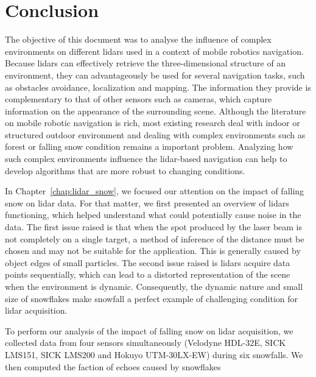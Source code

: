 \chapter*{Conclusion}

The objective of this document was to analyse the influence of complex environments on different \gls*{lidar}s used in a context of mobile robotics navigation. Because \gls*{lidar}s can effectively retrieve the three-dimensional structure of an environment, they can advantageously be used for several navigation tasks, such as obstacles avoidance, localization and mapping. The information they provide is complementary to that of other sensors such as cameras, which capture information on the appearance of the surrounding scene. Although the literature on mobile robotic navigation is rich, most existing research deal with indoor or structured outdoor environment and dealing with complex environments such as forest or falling snow condition remains a important problem. Analyzing how such complex environments influence the \gls*{lidar}-based navigation can help to develop algorithms that are more robust to changing conditions.

In Chapter~\ref{chap:lidar_snow}, we focused our attention on the impact of falling snow on \gls*{lidar} data. For that matter, we first presented an overview of \gls*{lidar}s functioning, which helped understand what could potentially cause noise in the data. The first issue raised is that when the spot produced by the laser beam is not completely on a single target, a method of inference of the distance must be chosen and may not be suitable for the application. This is generally caused by object edges of small particles. The second issue raised is \gls*{lidar}s acquire data points sequentially, which can lead to a distorted representation of the scene when the environment is dynamic. Consequently, the dynamic nature and small size of snowflakes make snowfall a perfect example of challenging condition for \gls*{lidar} acquisition.

To perform our analysis of the impact of falling snow on \gls*{lidar} acquisition, we collected data from four sensors simultaneously (Velodyne HDL-32E, SICK LMS151, SICK LMS200 and Hokuyo UTM-30LX-EW) during six snowfalls. We then computed the faction of echoes caused by snowflakes

